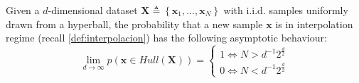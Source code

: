 \begin{theorem}\cite{barany1988shape}\label{dparadoxa}
	Given a $d$-dimensional dataset $\mathbf X \triangleq \left\{\mathbf{x}_1,...,\mathbf{x}_N\right\}$ with i.i.d. samples uniformly drawn from a hyperball, the probability that a new sample $\mathbf{x}$ is in interpolation regime (recall \cref{def:interpolacion}) has the following asymptotic behaviour:\\
	
	\begin{equation}
		\lim_{d \to \infty}p(\mathbf{x}\in Hull(\mathbf{X}))=
		\begin{cases}
			1 \iff N>d^{-1}2^{\frac{d}{2}}\\
			0 \iff N<d^{-1}2^{\frac{d}{2}}
		\end{cases}	
	\end{equation}
\end{theorem}

